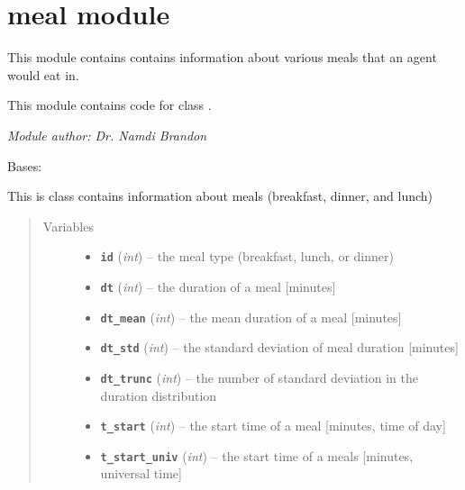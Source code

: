 \documentclass[letterpaper,10pt,english]{sphinxmanual}
\begin{document}
\section{meal module}
\label{meal::doc}\label{meal:meal-module}\label{meal:module-meal}
This module contains contains information about various meals that an agent  would eat in.

This module contains code for class {\hyperref[meal:meal.Meal]{\emph{}}}.

\emph{Module author: Dr. Namdi Brandon}

\begin{fulllineitems}
\label{meal:meal.Meal}
Bases: 

This is class contains information about meals (breakfast, dinner, and lunch)
\begin{quote}\begin{description}
\item[{Variables}] \leavevmode\begin{itemize}
\item {} 
\textbf{\texttt{id}} (\emph{int}) -- the meal type (breakfast, lunch, or dinner)

\item {} 
\textbf{\texttt{dt}} (\emph{int}) -- the duration of a meal {[}minutes{]}

\item {} 
\textbf{\texttt{dt\_mean}} (\emph{int}) -- the mean duration of a meal {[}minutes{]}

\item {} 
\textbf{\texttt{dt\_std}} (\emph{int}) -- the standard deviation of meal duration {[}minutes{]}

\item {} 
\textbf{\texttt{dt\_trunc}} (\emph{int}) -- the number of standard deviation in the duration distribution

\item {} 
\textbf{\texttt{t\_start}} (\emph{int}) -- the start time of a meal {[}minutes, time of day{]}

\item {} 
\textbf{\texttt{t\_start\_univ}} (\emph{int}) -- the start time of a meals {[}minutes, universal time{]}


\end{itemize}
\end{description}
\end{quote}
\end{fulllineitems}
\end{document}
